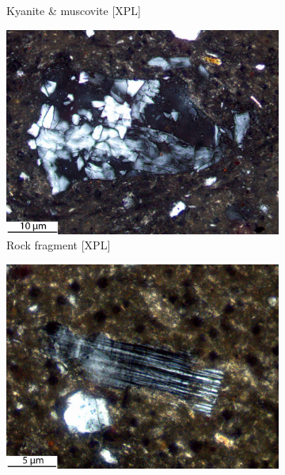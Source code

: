 \documentclass[a4paper]{article}
\begin{document}
\begin{figure}[H]
\begin{subfigure}[t]{.24\textwidth}
		\caption{Kyanite \& muscovite [XPL]}
	\end{subfigure}\hspace{.5em}\hfill
	\begin{subfigure}[t]{.24\textwidth}
		\includegraphics[width=\textwidth]{ThinSections/4-4_20x_XPL.jpg}
		\caption{Rock fragment [XPL]}
	\end{subfigure}\hspace{.1em}\hfill
	\begin{subfigure}[t]{.24\textwidth}
		\includegraphics[width=\textwidth]{ThinSections/4-5_40x_XPL.jpg}

\end{subfigure}
\end{figure}
\end{document}
